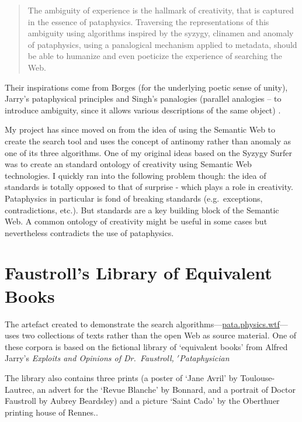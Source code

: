 \begin{quotation}
  The ambiguity of experience is the hallmark of creativity, that is captured in the essence of pataphysics. Traversing the representations of this ambiguity using algorithms inspired by the syzygy, clinamen and anomaly of pataphysics, using a panalogical mechanism applied to metadata, should be able to humanize and even poeticize the experience of searching the Web. 
\end{quotation}

Their inspirations come from Borges \citeyear{Borges2000} (for the underlying poetic sense of unity), Jarry's pataphysical principles \citeyear{Jarry1996} and Singh's panalogies (parallel analogies – to introduce ambiguity, since it allows various descriptions of the same object) \citeyear{Singh2005}.


My project has since moved on from the idea of using the Semantic Web to create the search tool and uses the concept of antinomy rather than anomaly as one of its three algorithms. One of my original ideas based on the Syzygy Surfer was to create an standard ontology of creativity using Semantic Web technologies. I quickly ran into the following problem though: the idea of standards is totally opposed to that of surprise - which plays a role in creativity. Pataphysics in particular is fond of breaking standards (e.g.\ exceptions, contradictions, etc.). But standards are a key building block of the Semantic Web. A common ontology of creativity might be useful in some cases but nevertheless contradicts the use of pataphysics.


\section{Faustroll's Library of Equivalent Books}
\label{s:faustlib}

The artefact created to demonstrate the search algorithms---\url{pata.physics.wtf}---uses two collections of texts rather than the open Web as source material. One of these corpora is based on the fictional library of `equivalent books' from Alfred Jarry's \textit{Exploits and Opinions of Dr.\ Faustroll, $'$Pataphysician} \citeyear[p.10-12]{Jarry1996}

The library also contains three prints (a poster of `Jane Avril' by Toulouse-Lautrec, an advert for the `Revue Blanche' by Bonnard, and a portrait of Doctor Faustroll by Aubrey Beardsley) and a picture `Saint Cado' by the Oberthuer printing house of Rennes.\autocite[p.12]{Jarry1996}.

